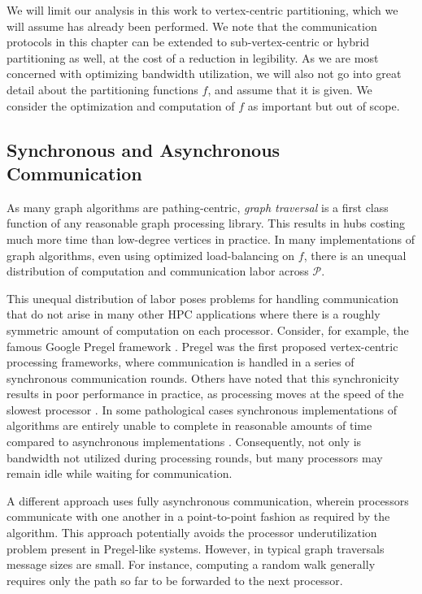 \documentclass{report}
\begin{document}
We will limit our analysis in this work to vertex-centric partitioning, which we will assume has already been performed. 
We note that the communication protocols in this chapter can be extended to sub-vertex-centric or hybrid partitioning as well, at the cost of a reduction in legibility. 
As we are most concerned with optimizing bandwidth utilization, we will also not go into great detail about the partitioning functions $f$, and assume that it is given.
We consider the optimization and computation of $f$ as important but out of scope. 


\subsection{Synchronous and Asynchronous Communication} \label{async:sec:intro:communication}


As many graph algorithms are pathing-centric, \emph{graph traversal} is a first class function of any reasonable graph processing library.
This results in hubs costing much more time than low-degree vertices in practice.
In many implementations of graph algorithms, even using optimized load-balancing on $f$, there is an unequal distribution of computation and communication labor across $\mathcal{P}$.

This unequal distribution of labor poses problems for handling communication that do not arise in many other HPC applications where there is a roughly symmetric amount of computation on each processor. 
Consider, for example, the famous Google Pregel framework \cite{malewicz2010pregel}.
Pregel was the first proposed vertex-centric processing frameworks, where communication is handled in a series of synchronous communication rounds.
Others have noted that this synchronicity results in poor performance in practice, as processing moves at the speed of the slowest processor \cite{pearce2014faster, junghanns2017management}.
In some pathological cases synchronous implementations of algorithms are entirely unable to complete in reasonable amounts of time compared to asynchronous implementations \cite{junghanns2017management}.
Consequently, not only is bandwidth not utilized during processing rounds, but many processors may remain idle while waiting for communication.

A different approach uses fully asynchronous communication, wherein processors communicate with one another in a point-to-point fashion as required by the algorithm.
This approach potentially avoids the processor underutilization problem present in Pregel-like systems.
However, in typical graph traversals message sizes are small.
For instance, computing a random walk generally requires only the path so far to be forwarded to the next processor.
\end{document}
